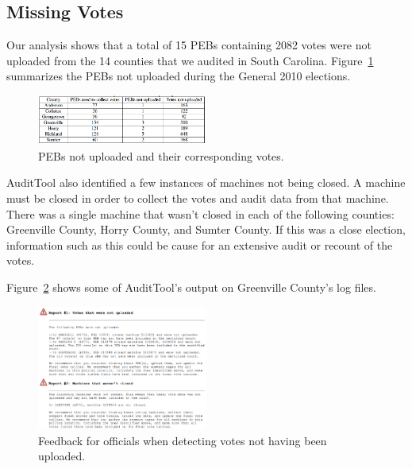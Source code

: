 \documentclass[letterpaper,twocolumn,10pt]{article}
\begin{document}
\subsection{Missing Votes}
Our analysis shows that a total of 15 PEBs containing 2082 votes were not
uploaded from the 14 counties that we audited in South
Carolina. Figure~\ref{fig:pebs-not-uploaded} summarizes the PEBs not uploaded
during the General 2010 elections.  

\begin{figure}[htbp]
\begin{center}
    \includegraphics[width=0.5\textwidth,height=0.1\textheight]{PEBsNotUploaded1.eps}
\end{center}
\caption{PEBs not uploaded and their corresponding votes.}
\label{fig:pebs-not-uploaded}
\end{figure}

AuditTool also identified a few instances of machines not being closed. A
machine must be closed in order to collect the votes and audit data from that
machine. There was a single machine that wasn’t closed in each of the following
counties: Greenville County, Horry County, and Sumter County. If this was a
close election, information such as this could be cause for an extensive audit
or recount of the votes.  

Figure~\ref{fig:greenville-logs} shows some of AuditTool’s output on Greenville
County’s log files. 

\begin{figure}[htbp]
\begin{center}
    \includegraphics[width=0.5\textwidth,height=0.3\textheight]{VotesNotUploaded.eps}
\end{center}
\caption{Feedback for officials when detecting votes not having been uploaded.}
\label{fig:greenville-logs}
\end{figure}
\end{document}
